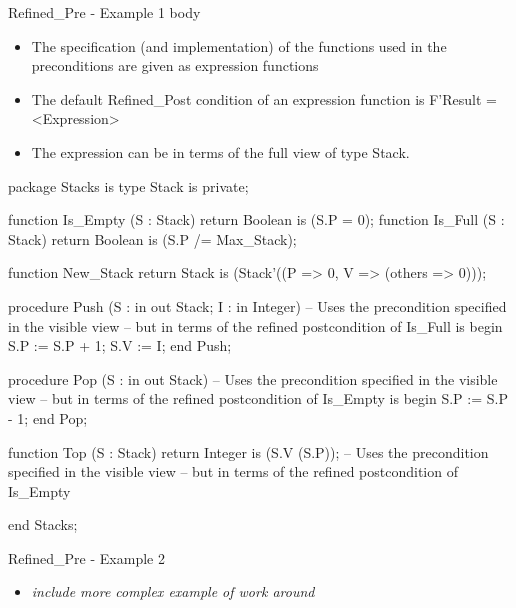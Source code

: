 \documentclass{beamer}
\begin{document}
\begin{frame}{Refined\_Pre - Example 1 body}

  \begin{itemize}

    \item The specification (and implementation) of the functions used
      in the preconditions are given as expression functions
    \item The default Refined\_Post condition of an expression
      function is F'Result = <Expression>
   \item The expression can be in terms of the full view of type Stack.
  \end{itemize}

  \begin{pxcode}[language=SPARK,style=tinystyle,gobble=4]
    package Stacks
    is
       type Stack is private;
 
       function Is_Empty (S : Stack) return Boolean is (S.P = 0);
       function Is_Full (S : Stack) return Boolean is (S.P /= Max_Stack);

       function New_Stack return Stack is (Stack'((P => 0, V => (others => 0)));

       procedure Push (S : in out Stack; I : in Integer)
       -- Uses the precondition specified in the visible view
       -- but in terms of the refined postcondition of Is_Full
       is
       begin
          S.P := S.P + 1;
          S.V := I;
       end Push;

       procedure Pop (S : in out Stack)
       -- Uses the precondition specified in the visible view
       -- but in terms of the refined postcondition of Is_Empty
       is
       begin
            S.P := S.P - 1;
       end Pop;

       function Top (S : Stack) return Integer is (S.V (S.P));
       -- Uses the precondition specified in the visible view
       -- but in terms of the refined postcondition of Is_Empty

    end Stacks;          
 \end{pxcode}

\end{frame}

 \begin{frame}{Refined\_Pre - Example 2}

  \begin{itemize}
  \item \emph{include more complex example of work around}
  \end{itemize}
 
\end{frame}
\end{document}
